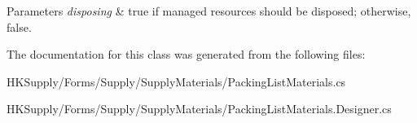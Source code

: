 \begin{DoxyParams}{Parameters}
{\em disposing} & true if managed resources should be disposed; otherwise, false.\\
\hline
\end{DoxyParams}


The documentation for this class was generated from the following files\+:\begin{DoxyCompactItemize}
\item 
H\+K\+Supply/\+Forms/\+Supply/\+Supply\+Materials/Packing\+List\+Materials.\+cs\item 
H\+K\+Supply/\+Forms/\+Supply/\+Supply\+Materials/Packing\+List\+Materials.\+Designer.\+cs\end{DoxyCompactItemize}
